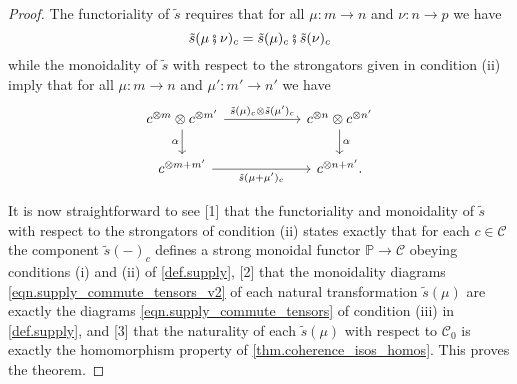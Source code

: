 \documentclass[11pt, oneside, article]{memoir}
\theoremstyle{plain}
\theoremstyle{definition}
\theoremstyle{remark}
\newcommand{\cat}[1]{\mathcal{#1}}%
\newcommand{\tpow}[1]{^{\otimes #1}}
\newcommand{\pp}{\mathbb{P}}
\newcommand{\mob}[1]{#1_0}
\newcommand{\cp}{\mathbin{\fatsemi}}
\begin{document}
\begin{proof}
The functoriality of $\tilde{s}$ requires that for all $\mu\colon m \to n$ and $\nu\colon n\to p$ we have
\[
  \tilde{s}(\mu\cp\nu)_c=\tilde{s}(\mu)_c\cp \tilde{s}(\nu)_c
\]
while the monoidality of $\tilde{s}$ with respect to the strongators given in condition (ii) imply that for all $\mu\colon m \to n $ and $\mu'\colon m' \to n'$ we have
\[
\begin{tikzcd}[column sep=55pt]
	c\tpow{m}\otimes c\tpow{m'}\ar[r, "\tilde{s}(\mu)_c\otimes \tilde{s}(\mu')_c"]\ar[d, "\alpha"']&
	c\tpow{n}\otimes c\tpow{n'}\ar[d, "\alpha"]\\
	c\tpow{m+m'}\ar[r, "\tilde{s}(\mu+\mu')_{c}"']&
	c\tpow{n+n'}.
\end{tikzcd}  
\]

It is now straightforward to see [1] that the functoriality and monoidality of $\tilde{s}$ with respect to the strongators of condition (ii) states exactly that for each $c \in \cat{C}$ the component $\tilde{s}(-)_c$ defines a strong monoidal functor $\pp \to \cat{C}$ obeying conditions (i) and (ii) of \cref{def.supply}, [2] that the monoidality diagrams \cref{eqn.supply_commute_tensors_v2} of each natural transformation $\tilde{s}(\mu)$ are exactly the diagrams \cref{eqn.supply_commute_tensors} of condition (iii) in \cref{def.supply}, and [3] that the naturality of each $\tilde{s}(\mu)$ with respect to $\mob{\cat{C}}$ is exactly the homomorphism property of \cref{thm.coherence_isos_homos}. This proves the theorem.
\end{proof}
\end{document}
